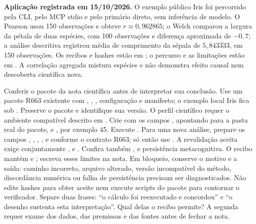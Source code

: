 \begin{resultado}
\textbf{Aplicação registrada em 15/10/2026.} O exemplo público Iris foi
percorrido pela CLI, pelo MCP stdio e pelo primário direto, sem inferência
de modelo. O Pearson usou 150 observações e obteve
$r\approx0{,}962865$; o Welch comparou a largura da pétala de duas espécies,
com 100 observações e diferença aproximada de $-0{,}7$; a análise descritiva
registrou média de comprimento da sépala de $5{,}843333$, em 150 observações.
Os recibos e hashes estão em ;
o percurso e as limitações estão em
. A correlação agregada mistura
espécies e não demonstra efeito causal nem descoberta científica nova.
\end{resultado}

\praticacore
{Conferir o pacote da nota científica antes de interpretar sua conclusão.}
{Use um pacote R663 existente com , , , configuração e manifesto; o exemplo local Iris fica sob . Preserve o pacote e identifique sua versão. O perfil científico requer o ambiente compatível descrito em .}
{Crie  com os campos , apontando para a pasta real do pacote, e , por exemplo 45. Execute . Para uma nova análise, prepare os campos , , , ,  e  conforme o contrato R663; só então use .}
{A revalidação aceita exige conjuntamente ,  e . Confira também ,  e persistência metacognitiva. O recibo mantém  e ; escreva esses limites na nota.}
{Em bloqueio, conserve o motivo e a saída: caminho incorreto, arquivo alterado, versão incompatível do método, discordância numérica ou falha de persistência precisam ser diagnosticados. Não edite hashes para obter aceite nem execute scripts do pacote para contornar o verificador.}
{Separe duas frases: ``o cálculo foi reexecutado e concordou'' e ``o desenho sustenta esta interpretação''. Qual delas o recibo permite? A segunda requer exame dos dados, das premissas e das fontes antes de fechar a nota.}

